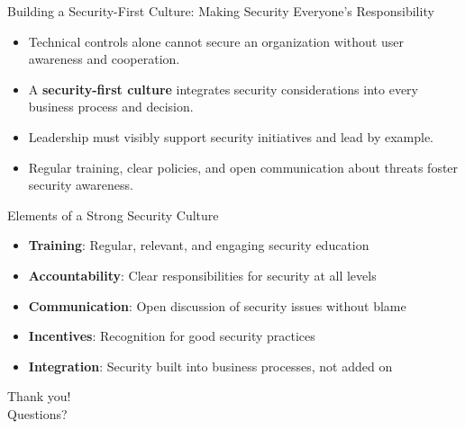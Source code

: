 \documentclass{beamer}
\begin{document}
                            \begin{frame}{Building a Security-First Culture: Making Security Everyone's Responsibility}
                            \begin{itemize}
                                \item Technical controls alone cannot secure an organization without user awareness and cooperation.
                                \item A \textbf{security-first culture} integrates security considerations into every business process and decision.
                                \item Leadership must visibly support security initiatives and lead by example.
                                \item Regular training, clear policies, and open communication about threats foster security awareness.
                            \end{itemize}
                            
                            \begin{block}{Elements of a Strong Security Culture}
                            \begin{itemize}
                                \item \textbf{Training}: Regular, relevant, and engaging security education
                                \item \textbf{Accountability}: Clear responsibilities for security at all levels
                                \item \textbf{Communication}: Open discussion of security issues without blame
                                \item \textbf{Incentives}: Recognition for good security practices
                                \item \textbf{Integration}: Security built into business processes, not added on
                            \end{itemize}
                            \end{block}
                            
                            \begin{center}
                            \Large Thank you!\\
                            \normalsize Questions?
                            \end{center}
                            \end{frame}
\end{document}
